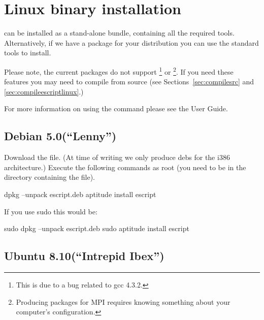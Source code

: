 
%
%
%

\section{Linux binary installation}
\label{sec:binlinux}

\esfinley can be installed as a stand-alone bundle, containing all the required tools.
Alternatively, if we have a package for your distribution you can use the standard tools to install.

Please note, the current packages do not support \openmp\footnote{This is due to a bug related to gcc 4.3.2.} or \mpi\footnote{Producing packages for MPI requires knowing something about your computer's configuration.}.
If you need these features you may need to compile \esfinley from source (see Sections~\ref{sec:compilesrc} and \ref{sec:compileescriptlinux}.)

For more information on using the  command please see the User Guide.

\subsection{Debian 5.0(``Lenny'')}

Download the  file.
(At time of writing we only produce debs for the i386 architecture.)
Execute the following commands as root (you need to be in the directory containing the file).
\begin{shellCode}
 dpkg --unpack escript.deb
 aptitude install escript
\end{shellCode}

If you use sudo this would be:
\begin{shellCode}
sudo dpkg --unpack escript.deb
sudo aptitude install escript
\end{shellCode}

\subsection{Ubuntu 8.10(``Intrepid Ibex'')}

